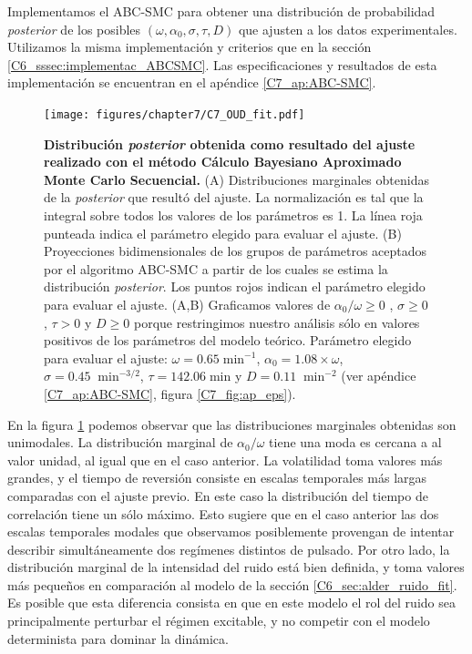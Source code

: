 \documentclass[./main.tex]{subfiles}
\begin{document}
Implementamos el ABC-SMC para obtener una distribución de probabilidad \textit{posterior} de los posibles $(\omega,\alpha_0,\sigma,\tau,D)$ que ajusten a los datos experimentales. Utilizamos la misma implementación y criterios que en la sección \ref{C6_sssec:implementac_ABCSMC}. Las especificaciones y resultados de esta implementación se encuentran en el apéndice \ref{C7_ap:ABC-SMC}.


\begin{figure}
    \centering
    \texttt{[image: figures/chapter7/C7\_OUD\_fit.pdf]} 
    \caption{\textbf{Distribución \textit{posterior} obtenida como resultado del ajuste realizado con el método Cálculo Bayesiano Aproximado Monte Carlo Secuencial.} (A) Distribuciones marginales obtenidas de la \textit{posterior} que resultó del ajuste. La normalización es tal que la integral sobre todos los valores de los parámetros es 1. La línea roja punteada indica el parámetro elegido para evaluar el ajuste. (B) Proyecciones bidimensionales de los grupos de parámetros aceptados por el algoritmo ABC-SMC a partir de los cuales se estima la distribución \textit{posterior}. Los puntos rojos indican el parámetro elegido para evaluar el ajuste. (A,B) Graficamos valores de $\alpha_0 / \omega \geq 0$ , $\sigma  \geq 0$, $\tau  > 0$ y $D  \geq 0$ porque restringimos nuestro análisis sólo en valores positivos de los parámetros del modelo teórico. Parámetro elegido para evaluar el ajuste: $\omega = 0.65 \; \text{min}^{-1}$, $\alpha_0 = 1.08 \times \omega$, $ \sigma = 0.45 \; \; \text{min}^{-3/2}$, $\tau = 142.06 \; \text{min} $ y $D = 0.11 \; \; \text{min}^{-2}$ (ver apéndice \ref{C7_ap:ABC-SMC}, figura \ref{C7_fig:ap_eps}).}
    \label{C7_fig:OUD_fit}
\end{figure} 


En la figura \ref{C7_fig:OUD_fit} podemos observar que las distribuciones marginales obtenidas son unimodales. La distribución marginal de $\alpha_0/\omega$ tiene una moda es cercana a al valor unidad, al igual que en el caso anterior. La volatilidad toma valores más grandes, y el tiempo de reversión consiste en escalas temporales más largas comparadas con el ajuste previo. En este caso la distribución del tiempo de correlación tiene un sólo máximo. Esto sugiere que en el caso anterior las dos escalas temporales modales que observamos posiblemente provengan de intentar describir simultáneamente dos regímenes distintos de pulsado. Por otro lado, la distribución marginal de la intensidad del ruido está bien definida, y toma valores más pequeños en comparación al modelo de la sección \ref{C6_sec:alder_ruido_fit}. Es posible que esta diferencia consista en que en este modelo el rol del ruido sea principalmente perturbar el régimen excitable, y no competir con el modelo determinista para dominar la dinámica. 
\end{document}
